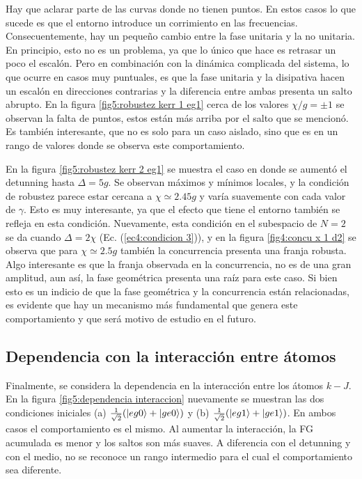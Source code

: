 Hay que aclarar parte de las curvas donde no tienen puntos. En estos casos lo que sucede es que el entorno introduce un corrimiento en las frecuencias. Consecuentemente, hay un pequeño cambio entre la fase unitaria y la no unitaria. En principio, esto no es un problema, ya que lo único que hace es retrasar un poco el escalón. Pero en combinación con la dinámica complicada del sistema, lo que ocurre en casos muy puntuales, es que la fase unitaria y la disipativa hacen un escalón en direcciones contrarias y la diferencia entre ambas presenta un salto abrupto. En la figura \ref{fig5:robustez kerr 1 eg1} cerca de los valores $\chi/g=\pm 1$ se observan la falta de puntos, estos están más arriba por el salto que se mencionó. Es también interesante, que no es solo para un caso aislado, sino que es en un rango de valores donde se observa este comportamiento. 

En la figura \ref{fig5:robustez kerr 2 eg1} se muestra el caso en donde se aumentó el detunning hasta $\Delta=5g$. Se observan máximos y mínimos locales, y la condición de robustez parece estar cercana a $\chi\simeq 2.45g$ y varía suavemente con cada valor de $\gamma$. Esto es muy interesante, ya que el efecto que tiene el entorno también se refleja en esta condición. Nuevamente, esta condición en el subespacio de $N=2$ se da cuando $\Delta=2\chi$ (Ec. (\ref{ec4:condicion 3})), y en la figura \ref{fig4:concu x 1 d2} se observa que para $\chi\simeq2.5g$ también la concurrencia presenta una franja robusta. Algo interesante es que la franja observada en la concurrencia, no es de una gran amplitud, aun así, la fase geométrica presenta una raíz para este caso. Si bien esto es un indicio de que la fase geométrica y la concurrencia están relacionadas, es evidente que hay un mecanismo más fundamental que genera este comportamiento y que será motivo de estudio en el futuro.

\subsection{Dependencia con la interacción entre átomos}
Finalmente, se considera la dependencia en la interacción entre los átomos $k-J$. En la figura \ref{fig5:dependencia interaccion} nuevamente se muestran las dos condiciones iniciales (a) $\frac{1}{\sqrt{2}}(\ket{eg0}+\ket{ge0})$ y (b) $\frac{1}{\sqrt{2}}(\ket{eg1}+\ket{ge1})$. En ambos casos el comportamiento es el mismo. Al aumentar la interacción, la FG acumulada es menor y los saltos son más suaves. A diferencia con el detunning y con el medio, no se reconoce un rango intermedio para el cual el comportamiento sea diferente. 

